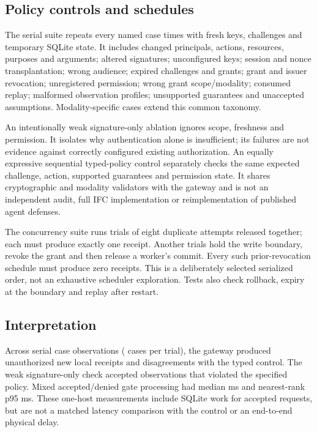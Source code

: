 \subsection{Policy controls and schedules}
The serial suite repeats every named case \BenchTrials{} times with fresh keys,
challenges and temporary SQLite state. It includes changed principals, actions,
resources, purposes and arguments; altered signatures; unconfigured keys; session
and nonce transplantation; wrong audience; expired challenges and grants; grant
and issuer revocation; unregistered permission; wrong grant scope/modality;
consumed replay; malformed observation profiles; unsupported guarantees and
unaccepted assumptions. Modality-specific cases extend this common taxonomy.

An intentionally weak signature-only ablation ignores scope, freshness and
permission. It isolates why authentication alone is insufficient; its failures
are not evidence against correctly configured existing authorization. An equally
expressive sequential typed-policy control separately checks the same expected
challenge, action, supported guarantees and permission state. It shares
cryptographic and modality validators with the gateway and is not an independent
audit, full IFC implementation or reimplementation of published agent defenses.

The concurrency suite runs \BenchTrials{} trials of eight duplicate attempts
released together; each must produce exactly one receipt. Another
\BenchTrials{} trials hold the write boundary, revoke the grant and then release a
worker's commit. Every such prior-revocation schedule must produce zero receipts.
This is a deliberately selected serialized order, not an exhaustive scheduler
exploration. Tests also check rollback, expiry at the boundary and replay after
restart.

\subsection{Interpretation}
Across \SecurityObservations{} serial case observations
(\SecurityCases{} cases per trial), the gateway produced
\UnauthorizedEffects{} unauthorized new local receipts and
\TypedDisagreements{} disagreements with the typed control. The weak
signature-only check accepted \SignatureFalseAccepts{} observations that violated
the specified policy. Mixed accepted/denied gate processing had median
\GateMedian{} ms and nearest-rank p95 \GatePninetyfive{} ms. These one-host
measurements include SQLite work for accepted requests, but are not a matched
latency comparison with the control or an end-to-end physical delay.

